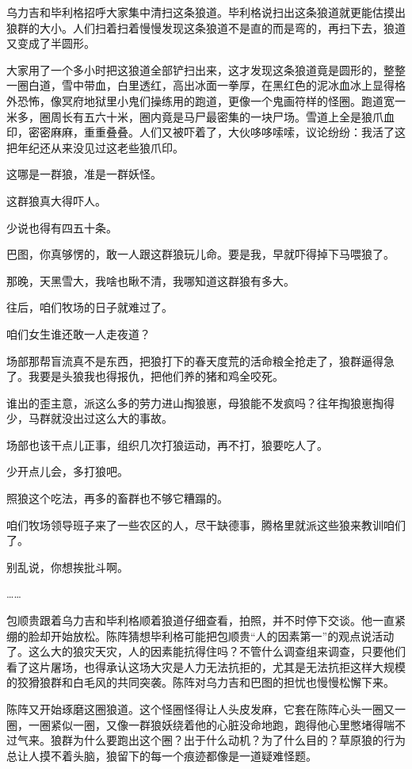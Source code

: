 \par 乌力吉和毕利格招呼大家集中清扫这条狼道。毕利格说扫出这条狼道就更能估摸出狼群的大小。人们扫着扫着慢慢发现这条狼道不是直的而是弯的，再扫下去，狼道又变成了半圆形。
\par 大家用了一个多小时把这狼道全部铲扫出来，这才发现这条狼道竟是圆形的，整整一圈白道，雪中带血，白里透红，高出冰面一拳厚，在黑红色的泥冰血冰上显得格外恐怖，像冥府地狱里小鬼们操练用的跑道，更像一个鬼画符样的怪圈。跑道宽一米多，圈周长有五六十米，圈内竟是马尸最密集的一块尸场。雪道上全是狼爪血印，密密麻麻，重重叠叠。人们又被吓着了，大伙哆哆嗦嗦，议论纷纷：我活了这把年纪还从来没见过这老些狼爪印。
\par 这哪是一群狼，准是一群妖怪。
\par 这群狼真大得吓人。
\par 少说也得有四五十条。
\par 巴图，你真够愣的，敢一人跟这群狼玩儿命。要是我，早就吓得掉下马喂狼了。
\par 那晚，天黑雪大，我啥也瞅不清，我哪知道这群狼有多大。
\par 往后，咱们牧场的日子就难过了。
\par 咱们女生谁还敢一人走夜道？
\par 场部那帮盲流真不是东西，把狼打下的春天度荒的活命粮全抢走了，狼群逼得急了。我要是头狼我也得报仇，把他们养的猪和鸡全咬死。
\par 谁出的歪主意，派这么多的劳力进山掏狼崽，母狼能不发疯吗？往年掏狼崽掏得少，马群就没出过这么大的事故。
\par 场部也该干点儿正事，组织几次打狼运动，再不打，狼要吃人了。
\par 少开点儿会，多打狼吧。
\par 照狼这个吃法，再多的畜群也不够它糟蹋的。
\par 咱们牧场领导班子来了一些农区的人，尽干缺德事，腾格里就派这些狼来教训咱们了。
\par 别乱说，你想挨批斗啊。
\par ……
\par 包顺贵跟着乌力吉和毕利格顺着狼道仔细查看，拍照，并不时停下交谈。他一直紧绷的脸却开始放松。陈阵猜想毕利格可能把包顺贵“人的因素第一”的观点说活动了。这么大的狼灾天灾，人的因素能抗得住吗？不管什么调查组来调查，只要他们看了这片屠场，也得承认这场大灾是人力无法抗拒的，尤其是无法抗拒这样大规模的狡猾狼群和白毛风的共同突袭。陈阵对乌力吉和巴图的担忧也慢慢松懈下来。
\par 陈阵又开始琢磨这圈狼道。这个怪圈怪得让人头皮发麻，它套在陈阵心头一圈又一圈，一圈紧似一圈，又像一群狼妖绕着他的心脏没命地跑，跑得他心里憋堵得喘不过气来。狼群为什么要跑出这个圈？出于什么动机？为了什么目的？草原狼的行为总让人摸不着头脑，狼留下的每一个痕迹都像是一道疑难怪题。
